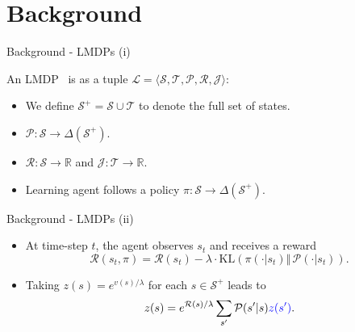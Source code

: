 \documentclass{beamer}
\theoremstyle{mystyle}
\newcommand{\cJ}{\mathcal{J}}
\newcommand{\cL}{\mathcal{L}}
\newcommand{\cP}{\mathcal{P}}
\newcommand{\cR}{\mathcal{R}}
\newcommand{\cS}{\mathcal{S}}
\newcommand{\cT}{\mathcal{T}}
\newcommand{\EEc}[2]{\mathbb{E}\left[#1\;\middle\lvert\;#2\right]}
\newcommand{\real}{\mathbb{R}}
\begin{document}
\section{Background}
\begin{frame}{Background - LMDPs (i)}

    An LMDP~\citep{KappenML2012,TodorovNIPS2007} is as a tuple $\cL=\langle\cS,\cT,\cP,\cR,\cJ\rangle$:
    
    \begin{itemize}
        \item We define $\cS^+=\cS\cup\cT$ to denote the full set of states.
        \item $\cP:\cS\rightarrow\Delta(\cS^+)$. %
        \item $\cR:\cS\rightarrow\real$ and $\cJ:\cT\rightarrow\real$.
        \item Learning agent follows a policy $\pi:\cS\rightarrow\Delta(\cS^+)$.
    \end{itemize}
    
    
\end{frame}

\begin{frame}{Background - LMDPs (ii)}
    
    \begin{itemize}

        \item At time-step $t$, the agent observes $s_t$ and receives a reward \[ \cR(s_t,\pi) = \cR(s_t) - \lambda\cdot\mathrm{KL}(\pi(\cdot|s_t)\Vert\, \cP(\cdot|s_t)). \]
        \item Taking $z(s)=e^{v(s)/\lambda}$ for each $s\in\cS^+$ leads to \[ z(s) = e^{\cR(s)/\lambda} \sum_{s'}\cP(s'|s){\color{blue}z(s')}. \]

    \end{itemize}
\end{frame}
\end{document}
